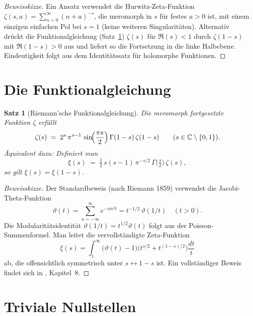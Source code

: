 \documentclass[12pt,a4paper]{amsart}
\newtheorem{theorem}{Satz}[section]
\theoremstyle{definition}
\newcommand{\C}{\mathbb{C}}
\begin{document}
\begin{proof}[Beweisskizze]
Ein Ansatz verwendet die Hurwitz-Zeta-Funktion
$\zeta(s, a) = \sum_{n=0}^\infty (n+a)^{-s}$, die meromorph in $s$
f\"ur festes $a > 0$ ist, mit einem einzigen einfachen Pol bei $s = 1$
(keine weiteren Singularit\"aten).
Alternativ dr\"uckt die Funktionalgleichung (Satz~\ref{thm:functional_eq})
$\zeta(s)$ f\"ur $\Re(s) < 1$ durch $\zeta(1-s)$ mit $\Re(1-s) > 0$ aus und
liefert so die Fortsetzung in die linke Halbebene.
Eindeutigkeit folgt aus dem Identit\"atssatz f\"ur holomorphe Funktionen.
\end{proof}

\section{Die Funktionalgleichung}

\begin{theorem}[Riemann'sche Funktionalgleichung]
\label{thm:functional_eq}
Die meromorph fortgesetzte Funktion $\zeta$ erf\"ullt
\begin{equation}
  \label{eq:functional}
  \zeta(s) \;=\; 2^s\,\pi^{s-1}\,\sin\!\Bigl(\frac{\pi s}{2}\Bigr)\,
  \Gamma(1-s)\,\zeta(1-s)
  \qquad (s \in \C \setminus \{0,1\}).
\end{equation}
\"Aquivalent dazu: Definiert man
\[
  \xi(s) \;=\; \tfrac{1}{2}\,s(s-1)\,\pi^{-s/2}\,\Gamma\!\bigl(\tfrac{s}{2}\bigr)\,\zeta(s),
\]
so gilt $\xi(s) = \xi(1-s)$.
\end{theorem}

\begin{proof}[Beweisskizze]
Der Standardbeweis (nach Riemann 1859) verwendet die Jacobi-Theta-Funktion
\[
  \vartheta(t) = \sum_{n=-\infty}^{\infty} e^{-\pi n^2 t}
  = t^{-1/2}\,\vartheta(1/t) \quad (t > 0).
\]
Die Modularit\"atsidentit\"at $\vartheta(1/t) = t^{1/2}\vartheta(t)$ folgt
aus der Poisson-Summenformel.
Man leitet die vervollst\"andigte Zeta-Funktion
\[
  \xi(s) = \int_1^{\infty} \bigl(\vartheta(t)-1\bigr)
  \bigl(t^{s/2} + t^{(1-s)/2}\bigr)\frac{dt}{t}
\]
ab, die offensichtlich symmetrisch unter $s \leftrightarrow 1-s$ ist.
Ein vollst\"andiger Beweis findet sich in \cite{Davenport2000}, Kapitel~8.
\end{proof}

\section{Triviale Nullstellen}
\end{document}
